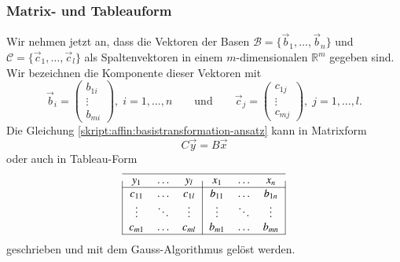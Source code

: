 \subsubsection{Matrix- und Tableauform}
Wir nehmen jetzt an, dass die Vektoren der Basen
$\mathcal{B}=\{\vec{b}_1,\dots,\vec{b}_n\}$
und
$\mathcal{C}=\{\vec{c}_1,\dots,\vec{c}_l\}$
als Spaltenvektoren in einem $m$-dimensionalen $\mathbb R^m$
gegeben sind.
Wir bezeichnen die Komponente dieser Vektoren mit
\[
\vec{b}_i = \begin{pmatrix}b_{1i}\\\vdots\\b_{mi}\end{pmatrix},\;i=1,\dots,n
\qquad\text{und}\qquad
\vec{c}_j = \begin{pmatrix}c_{1j}\\\vdots\\c_{mj}\end{pmatrix},\;j=1,\dots,l.
\]
Die Gleichung
\eqref{skript:affin:basistransformation-ansatz}
kann in Matrixform
\begin{equation}
C\vec{y} = B\vec{x}
\label{skript:affin:basistransformation-matrix}
\end{equation}
oder auch
in Tableau-Form
\begin{equation}
\begin{tabular}{|>{$}c<{$}>{$}c<{$}>{$}c<{$}|>{$}c<{$}>{$}c<{$}>{$}c<{$}|}
\hline
   y_1&\dots &   y_l&   x_1&\dots &   x_n\\
\hline
c_{11}&\dots &c_{1l}&b_{11}&\dots &b_{1n}\\
\vdots&\ddots&\vdots&\vdots&\ddots&\vdots\\
c_{m1}&\dots &c_{ml}&b_{m1}&\dots &b_{mn}\\
\hline
\end{tabular}
\label{skript:affin:basistransformation-tableau}
\end{equation}
geschrieben und mit dem Gauss-Algorithmus gelöst werden.

